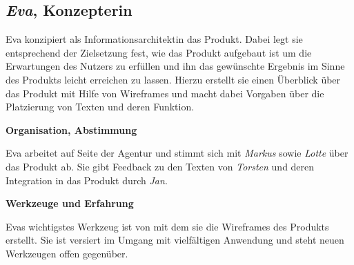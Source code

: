 \pagebreak

\subsection{\emph{Eva}, Konzepterin}\label{p:eva}

\begin{multicols}{2}

\begin{center}
\end{center}


Eva konzipiert als Informationsarchitektin das Produkt. Dabei legt sie entsprechend der Zielsetzung fest, wie das Produkt aufgebaut ist um die Erwartungen des Nutzers zu erfüllen und ihn das gewünschte Ergebnis im Sinne des Produkts leicht erreichen zu lassen. Hierzu erstellt sie einen Überblick über das Produkt mit Hilfe von Wireframes und macht dabei Vorgaben über die Platzierung von Texten und deren Funktion.

\textbf{Organisation, Abstimmung}

Eva arbeitet auf Seite der Agentur und stimmt sich mit \emph{Markus} sowie \emph{Lotte} über das Produkt ab. Sie gibt Feedback zu den Texten von \emph{Torsten} und deren Integration in das Produkt durch \emph{Jan}.

\textbf{Werkzeuge und Erfahrung}

Evas wichtigstes Werkzeug ist  von  mit dem sie die Wireframes des Produkts erstellt. Sie ist versiert im Umgang mit vielfältigen Anwendung und steht neuen Werkzeugen offen gegenüber.


\end{multicols}
